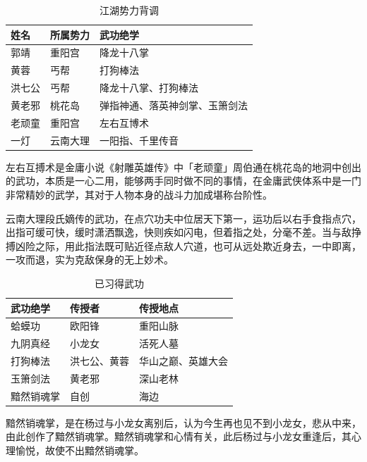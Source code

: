 \documentclass[doctor, vlined, ]{DissertUESTC}
\begin{document}
	\begin{table}[!ht]
		\caption{江湖势力背调} \label{tab: 江湖势力背调}
		\begin{threeparttable}
			\begin{tabular}{p{2cm} p{3cm}<{\centering} p{7cm}<{\raggedleft}}
				\toprule
				\textbf{姓名} & \textbf{所属势力} & \textbf{武功绝学} \\
				\midrule
				郭靖 & 重阳宫 & 降龙十八掌 \\
				黄蓉 & 丐帮 & 打狗棒法 \\
				洪七公 & 丐帮 & 降龙十八掌、打狗棒法 \\
				黄老邪 & 桃花岛 & 弹指神通、落英神剑掌、玉箫剑法 \\
				老顽童 & 重阳宫 & 左右互博术\tnote{1} \\
				一灯 & 云南大理 & 一阳指\tnote{2}、千里传音 \\
				\bottomrule
			\end{tabular}
			\begin{tablenotes}
				\item[1] 左右互搏术是金庸小说《射雕英雄传》中「老顽童」周伯通在桃花岛的地洞中创出的武功，本质是一心二用，能够两手同时做不同的事情，在金庸武侠体系中是一门非常精妙的武学，其对于人物本身的战斗力加成堪称台阶性。
				\item[2] 云南大理段氏嫡传的武功，在点穴功夫中位居天下第一，运功后以右手食指点穴，出指可缓可快，缓时潇洒飘逸，快则疾如闪电，但着指之处，分毫不差。当与敌挣搏凶险之际，用此指法既可贴近径点敌人穴道，也可从远处欺近身去，一中即离，一攻而退，实为克敌保身的无上妙术。
			\end{tablenotes}
		\end{threeparttable}
	\end{table}
	
	\begin{table}[!ht]
		\caption{已习得武功} \label{tab: 已习得武功}
		\begin{threeparttable}
			\begin{tabular}{p{3cm} p{3cm} p{5cm}}
				\toprule
				\textbf{武功绝学} & \textbf{传授者} & \textbf{传授地点} \\
				\midrule
				蛤蟆功 & 欧阳锋 & 重阳山脉 \\
				九阴真经 & 小龙女 & 活死人墓 \\
				打狗棒法 & 洪七公、黄蓉 & 华山之巅、英雄大会 \\
				玉箫剑法 & 黄老邪 & 深山老林 \\
				黯然销魂掌\tnote{1} & 自创 & 海边 \\
				\bottomrule
			\end{tabular}
			\begin{tablenotes}[online]
				\item[1] 黯然销魂掌，是在杨过与小龙女离别后，认为今生再也见不到小龙女，悲从中来，由此创作了黯然销魂掌。黯然销魂掌和心情有关，此后杨过与小龙女重逢后，其心理愉悦，故使不出黯然销魂掌。
			\end{tablenotes}
		\end{threeparttable}
	\end{table}
\end{document}
